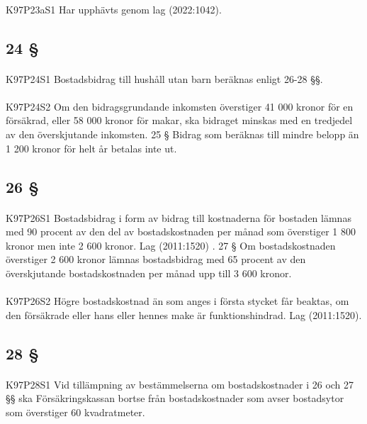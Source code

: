 \documentclass[a4paper,notitlepage,openany,10pt]{book}
\begin{document}
\paragraph*{}
{\tiny K97P23aS1}
Har upphävts genom
lag (2022:1042).
\subsection*{24 §}
\paragraph*{}
{\tiny K97P24S1}
Bostadsbidrag till hushåll utan barn beräknas enligt 26-28 §§.
\paragraph*{}
{\tiny K97P24S2}
Om den bidragsgrundande inkomsten överstiger 41 000 kronor för en försäkrad, eller 58 000 kronor för makar, ska bidraget minskas med en tredjedel av den överskjutande inkomsten. 25 § Bidrag som beräknas till mindre belopp än 1 200 kronor för helt år betalas inte ut.
\subsection*{26 §}
\paragraph*{}
{\tiny K97P26S1}
Bostadsbidrag i form av bidrag till kostnaderna för bostaden lämnas med 90 procent av den del av bostadskostnaden per månad som överstiger 1 800 kronor men inte 2 600 kronor.
Lag (2011:1520)
. 27 § Om bostadskostnaden överstiger 2 600 kronor lämnas bostadsbidrag med 65 procent av den överskjutande bostadskostnaden per månad upp till 3 600 kronor.
\paragraph*{}
{\tiny K97P26S2}
Högre bostadskostnad än som anges i första stycket får beaktas, om den försäkrade eller hans eller hennes make är funktionshindrad.
Lag (2011:1520).
\subsection*{28 §}
\paragraph*{}
{\tiny K97P28S1}
Vid tillämpning av bestämmelserna om bostadskostnader i 26 och 27 §§ ska Försäkringskassan bortse från bostadskostnader som avser bostadsytor som överstiger 60 kvadratmeter.
\end{document}
